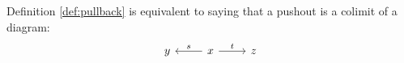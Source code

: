 \begin{definition}
  Definition \ref{def:pullback} is equivalent to saying that a pushout is a
  colimit of a diagram:
  \[\begin{tikzcd}[ampersand replacement=\&]
    y \& x \& z
    \arrow["t", from=1-2, to=1-3]
    \arrow["s"', from=1-2, to=1-1]
  \end{tikzcd}\]
\end{definition}